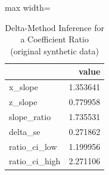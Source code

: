 \begin{table}[htbp]
\centering
\caption{Delta-Method Inference for a Coefficient Ratio (original synthetic data)}
\begingroup
\small
\setlength{\tabcolsep}{6pt}
\renewcommand{\arraystretch}{1.12}
\begin{adjustbox}{max width=\linewidth}
\begin{tabular}{@{}lr@{}}
\toprule
 & value \\
\midrule
x\_slope & 1.353641 \\
z\_slope & 0.779958 \\
slope\_ratio & 1.735531 \\
delta\_se & 0.271862 \\
ratio\_ci\_low & 1.199956 \\
ratio\_ci\_high & 2.271106 \\
\bottomrule
\end{tabular}
\end{adjustbox}
\endgroup
\end{table}